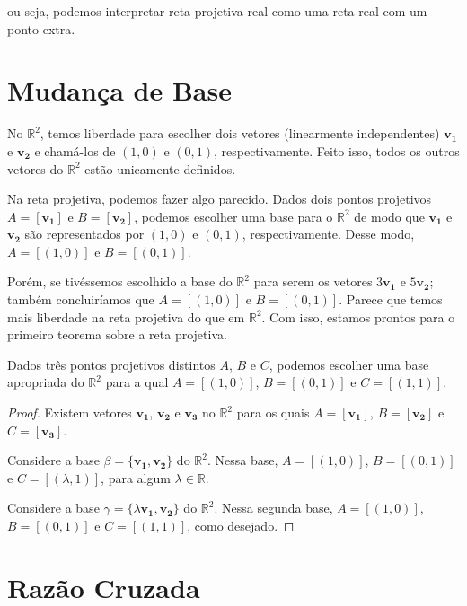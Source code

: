 ou seja, podemos interpretar reta projetiva real como uma reta real com um ponto extra.

\section{Mudança de Base}

No \(\mathbb{R}^2\), temos liberdade para escolher dois vetores (linearmente independentes) \(\mathbf{v_1}\) e \(\mathbf{v_2}\) e chamá-los de \((1, 0)\) e \((0, 1)\), respectivamente.
Feito isso, todos os outros vetores do \(\mathbb{R}^2\) estão unicamente definidos.

Na reta projetiva, podemos fazer algo parecido. Dados dois pontos projetivos \(A = [\mathbf{v_1}]\) e \(B = [\mathbf{v_2}]\), podemos escolher uma base para o \(\mathbb{R}^2\) de modo que \(\mathbf{v_1}\) e \(\mathbf{v_2}\) são representados por \((1, 0)\) e \((0, 1)\), respectivamente.
Desse modo, \(A = [(1, 0)]\) e  \(B = [(0, 1)]\).

Porém, se tivéssemos escolhido a base do \(\mathbb{R}^2\) para serem os vetores \(3\mathbf{v_1}\) e  \(5\mathbf{v_2}\); também concluiríamos que \(A = [(1, 0)] \) e \(B = [(0, 1)]\). Parece que temos mais liberdade na reta projetiva do que em \(\mathbb{R}^2\). Com isso, estamos prontos para o primeiro teorema sobre a reta projetiva.

\begin{thm}\label{thm:trespontos}
  Dados três pontos projetivos distintos \(A\), \(B\) e \(C\), podemos escolher uma base apropriada do \(\mathbb{R}^2\) para a qual \(A = [(1, 0)]\),  \(B = [(0, 1)]\) e \(C = [(1, 1)]\).
\end{thm}
\begin{proof}
  Existem vetores \(\mathbf{v_1}\), \(\mathbf{v_2}\) e \(\mathbf{v_3}\) no \(\mathbb{R}^2\) para os quais \(A = [\mathbf{v_1}]\), \(B = [\mathbf{v_2}]\) e \(C = [\mathbf{v_3}]\).

  Considere a base \(\beta = \{\mathbf{v_1}, \mathbf{v_2}\}\) do \(\mathbb{R}^2\). Nessa base, \(A = [(1, 0)]\),  \(B = [(0, 1)]\) e \(C = [(\lambda, 1)]\), para algum \(\lambda \in \mathbb{R}\).

  Considere a base \(\gamma = \{\lambda\mathbf{v_1}, \mathbf{v_2}\}\) do \(\mathbb{R}^2\). Nessa segunda base, \(A = [(1, 0)]\),  \(B = [(0, 1)]\) e \(C = [(1, 1)]\), como desejado.
\end{proof}

\section{Razão Cruzada}

